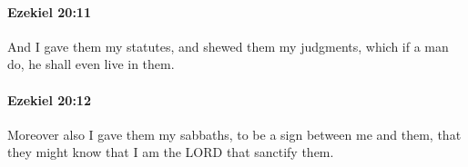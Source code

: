 		\paragraph{Ezekiel 20:11} %
			\label{EZEKIEL-20-11}

			And I gave them my statutes, and shewed them my judgments, which if a man do, he shall even live in them.


		\paragraph{Ezekiel 20:12} %
			\label{EZEKIEL-20-12}

			Moreover also I gave them my sabbaths, to be a sign between me and them, that they might know that I am the LORD that sanctify them.


